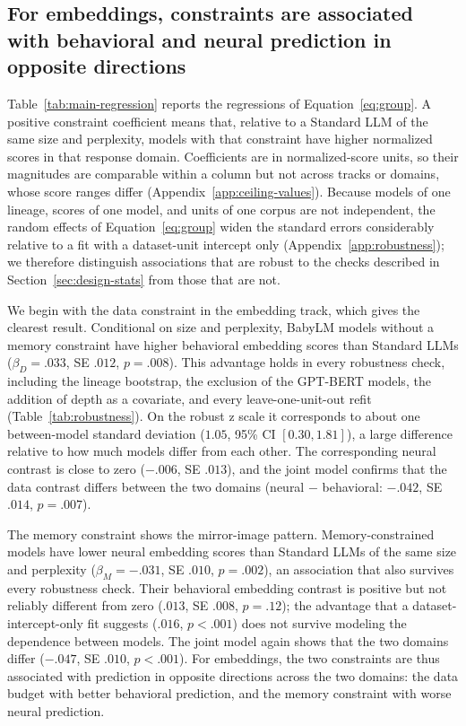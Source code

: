 \subsection{For embeddings, constraints are associated with behavioral and neural prediction in opposite directions}
\label{sec:results-constraints}



Table~\ref{tab:main-regression} reports the regressions of Equation~\ref{eq:group}. A positive constraint coefficient means that, relative to a Standard LLM of the same size and perplexity, models with that constraint have higher normalized scores in that response domain. Coefficients are in normalized-score units, so their magnitudes are comparable within a column but not across tracks or domains, whose score ranges differ (Appendix~\ref{app:ceiling-values}). Because models of one lineage, scores of one model, and units of one corpus are not independent, the random effects of Equation~\ref{eq:group} widen the standard errors considerably relative to a fit with a dataset-unit intercept only (Appendix~\ref{app:robustness}); we therefore distinguish associations that are robust to the checks described in Section~\ref{sec:design-stats} from those that are not.

We begin with the data constraint in the embedding track, which gives the clearest result. Conditional on size and perplexity, BabyLM models without a memory constraint have higher behavioral embedding scores than Standard LLMs ($\beta_D=.033$, SE $.012$, $p=.008$). This advantage holds in every robustness check, including the lineage bootstrap, the exclusion of the GPT-BERT models, the addition of depth as a covariate, and every leave-one-unit-out refit (Table~\ref{tab:robustness}). On the robust z scale it corresponds to about one between-model standard deviation ($1.05$, 95\% CI $[0.30, 1.81]$), a large difference relative to how much models differ from each other. The corresponding neural contrast is close to zero ($-.006$, SE $.013$), and the joint model confirms that the data contrast differs between the two domains (neural $-$ behavioral: $-.042$, SE $.014$, $p=.007$).

The memory constraint shows the mirror-image pattern. Memory-constrained models have lower neural embedding scores than Standard LLMs of the same size and perplexity ($\beta_M=-.031$, SE $.010$, $p=.002$), an association that also survives every robustness check. Their behavioral embedding contrast is positive but not reliably different from zero ($.013$, SE $.008$, $p=.12$); the advantage that a dataset-intercept-only fit suggests ($.016$, $p<.001$) does not survive modeling the dependence between models. The joint model again shows that the two domains differ ($-.047$, SE $.010$, $p<.001$). For embeddings, the two constraints are thus associated with prediction in opposite directions across the two domains: the data budget with better behavioral prediction, and the memory constraint with worse neural prediction.

